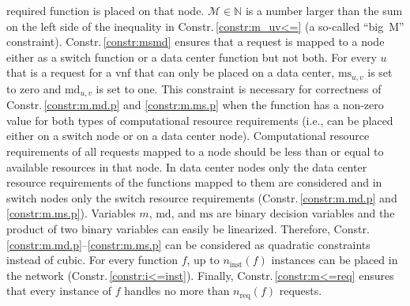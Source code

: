 \documentclass[10pt,a4paper,conference]{IEEEtran}
\begin{document}
required function is placed on that node. $ \mathcal{M} {\in} \mathbb{N} $ is a 
number larger than the sum on the left side of the inequality in Constr.\,\ref{constr:m_uv<=}
(a so-called ``big~M'' constraint). Constr.\,\ref{constr:msmd} ensures that a request is mapped to a node 
either as a switch function or a data center function but not both. For every 
$ u $ that is a request for a \ac{vnf} that can only be placed on a data center, 
$ \text{ms}_{u,v} $ is set to zero and $ \text{md}_{u,v} $ is set to one. 
This constraint is necessary for correctness of Constr.\,\ref{constr:m.md.p} and \ref{constr:m.ms.p} when the function has a non-zero value for both types of 
computational resource requirements (i.e., can be placed either on a switch node 
or on a data center node). Computational resource requirements of all requests 
mapped to a node should be less than or equal to available resources in that node.
In data center nodes only the data center resource requirements of the functions 
mapped to them are considered and in switch nodes only the switch resource 
requirements (Constr.\,\ref{constr:m.md.p} and \ref{constr:m.ms.p}).
Variables $ m $, $ \text{md} $, and $ \text{ms} $ are binary decision variables
and the product of two binary variables can easily be linearized. Therefore, 
Constr.\,\ref{constr:m.md.p}--\ref{constr:m.ms.p} can be considered as quadratic 
constraints instead of cubic. For every
function $ f $, up to $ n_{\text{inst}}(f) $ instances can be placed in the network
(Constr.\,\ref{constr:i<=inst}). Finally, Constr.\,\ref{constr:m<=req} ensures
that every instance of $ f $ handles no more than $ n_{\text{req}}(f) $ requests.
\end{document}
